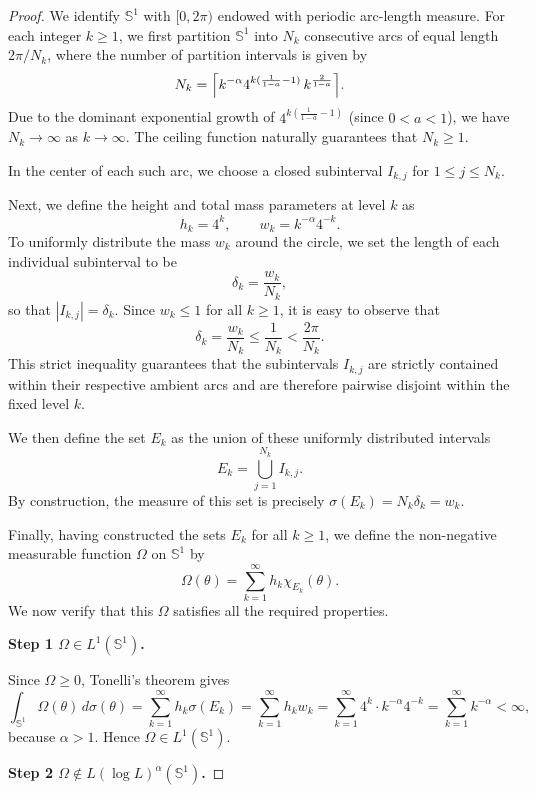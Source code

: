 \documentclass[11pt]{amsart}
\begin{document}
\begin{proof}
	We identify $\mathbb{S}^1$ with $[0,2\pi)$ endowed with periodic arc-length measure. For each integer $k \ge 1$, we first partition $\mathbb{S}^1$ into $N_k$ consecutive arcs of equal length $2\pi/N_k$, where the number of partition intervals is given by
	$$N_k = \Bigl\lceil k^{-\alpha}4^{k(\frac{1}{1-a} - 1)}\,k^{\frac{2}{1-a}}\Bigr\rceil.$$
	Due to the dominant exponential growth of $4^{k(\frac{1}{1-a} - 1)}$ (since $0<a<1$), we have $N_k \to \infty$ as $k \to \infty$. The ceiling function naturally guarantees that $N_k \ge 1$. 
	
	In the center of each such arc, we choose a closed subinterval $I_{k,j}$ for $1 \le j \le N_k$. 
	
	Next, we define the height and total mass parameters at level $k$ as
	$$h_k = 4^k, \qquad w_k = k^{-\alpha}4^{-k}.$$
	To uniformly distribute the mass $w_k$ around the circle, we set the length of each individual subinterval to be
	$$\delta_k = \frac{w_k}{N_k},$$
	so that $|I_{k,j}| = \delta_k$. Since $w_k \le 1$ for all $k \ge 1$, it is easy to observe that
	$$\delta_k = \frac{w_k}{N_k} \le \frac{1}{N_k} < \frac{2\pi}{N_k}.$$
	This strict inequality guarantees that the subintervals $I_{k,j}$ are strictly contained within their respective ambient arcs and are therefore pairwise disjoint within the fixed level $k$.
	
	We then define the set $E_k$ as the union of these uniformly distributed intervals
	$$E_k = \bigcup_{j=1}^{N_k} I_{k,j}.$$
	By construction, the measure of this set is precisely $\sigma(E_k) = N_k \delta_k = w_k$.
	
	Finally, having constructed the sets $E_k$ for all $k \ge 1$, we define the non-negative measurable function $\Omega$ on $\mathbb{S}^1$ by
	$$\Omega(\theta) = \sum_{k=1}^\infty h_k \chi_{E_k}(\theta).$$
	We now verify that this $\Omega$ satisfies all the required properties.
	
	\medskip
	\noindent\textbf{Step 1 \(\Omega\in L^1(\mathbb{S}^1)\).}
	
	Since $\Omega\ge 0$, Tonelli's theorem gives
	\[
	\int_{\mathbb{S}^1}\Omega(\theta)\,d\sigma(\theta)
	=\sum_{k=1}^\infty h_k \sigma(E_k)
	=\sum_{k=1}^\infty h_k w_k
	=\sum_{k=1}^\infty 4^k\cdot k^{-\alpha}4^{-k}
	=\sum_{k=1}^\infty k^{-\alpha}<\infty,
	\]
	because $\alpha>1$. Hence $\Omega\in L^1(\mathbb{S}^1)$.
	
	\medskip
	\noindent\textbf{Step 2 \(\Omega\notin L(\log L)^\alpha(\mathbb{S}^1)\).}
	

\end{proof}
\end{document}
